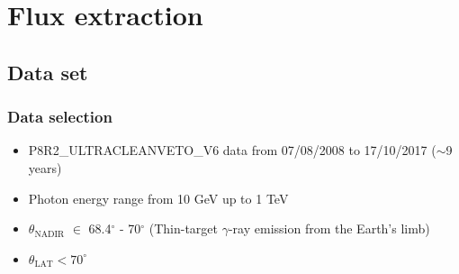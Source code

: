\documentclass{beamer}
\begin{document}
\section{Flux extraction}
\subsection{Data set}

\begin{frame}
\frametitle{Data selection}
\begin{itemize}
  \item P8R2\_ULTRACLEANVETO\_V6 data from 07/08/2008 to 17/10/2017 ($\sim$9 years) %
  \item Photon energy range from 10 GeV up to 1 TeV
  \item $\theta_{\text{NADIR}}$ $\in$ 68.4$^\circ$  - 70$^\circ$
  (Thin-target $\gamma$-ray emission from the Earth's limb)
  \item $\theta_{\text{LAT}} < 70^\circ$
\end{itemize}
\end{frame}

\end{document}
